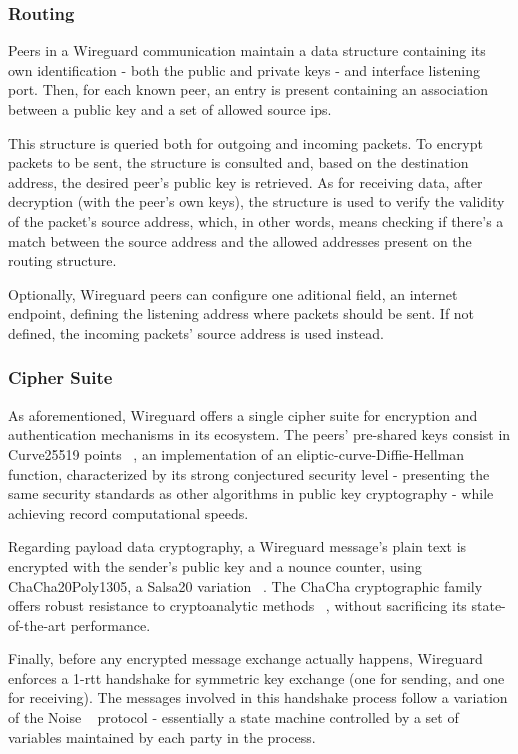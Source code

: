 \documentclass[11pt,twoside,a4paper]{report}
\begin{document}
\subsubsection{Routing}

Peers in a Wireguard communication maintain a data structure containing its own identification - both the public and private keys - and interface listening port. Then, for each known peer, an entry is present containing an association between a public key and a set of allowed source ips.

This structure is queried both for outgoing and incoming packets. To encrypt packets to be sent, the structure is consulted and, based on the destination address, the desired peer's public key is retrieved. As for receiving data, after decryption (with the peer's own keys), the structure is used to verify the validity of the packet's source address, which, in other words, means checking if there's a match between the source address and the allowed addresses present on the routing structure.

Optionally, Wireguard peers can configure one aditional field, an internet endpoint, defining the listening address where packets should be sent. If not defined, the incoming packets' source address is used instead.

\subsubsection{Cipher Suite}

As aforementioned, Wireguard offers a single cipher suite for encryption and authentication mechanisms in its ecosystem. The peers' pre-shared keys consist in  Curve25519 points ~\cite{bernstein2006curve25519}, an implementation of an eliptic-curve-Diffie-Hellman function, characterized by its strong conjectured security level - presenting the same security standards as other algorithms in public key cryptography - while achieving record computational speeds.

Regarding payload data cryptography, a Wireguard message's plain text is encrypted with the sender's public key and a nounce counter, using ChaCha20Poly1305, a Salsa20 variation ~\cite{bernstein2008chacha}. The ChaCha cryptographic family offers robust resistance to cryptoanalytic methods ~\cite{cryptoeprint:2014/613}, without sacrificing its state-of-the-art performance.

Finally, before any encrypted message exchange actually happens, Wireguard enforces a 1-\acrshort{rtt} handshake for symmetric key exchange (one for sending, and one for receiving). The messages involved in this handshake process follow a variation of the Noise ~\cite{perrin2018noise} protocol - essentially a state machine controlled by a set of variables maintained by each party in the process.
\end{document}
